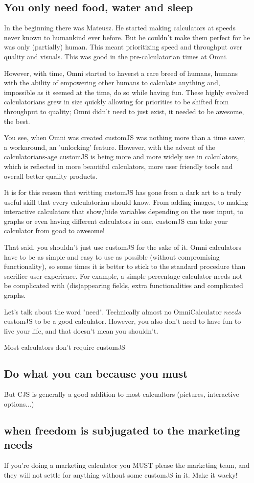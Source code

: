 \subsection{You only need food, water and sleep}
\label{sub:need}
In the beginning there was Mateusz. He started making calculators at speeds never known to humankind ever before. But he couldn't make them perfect for he was only (partially) human. This meant prioritizing speed and throughput over quality and visuals. This was good in the pre-calculatorian times at Omni.

However, with time, Omni started to haverst a rare breed of humans, humans with the ability of empowering other humans to calculate anything and, impossible as it seemed at the time, do so while having fun. These highly evolved calculatorians grew in size quickly allowing for priorities to be shifted from throughput to quality; Omni didn't need to just exist, it needed to be awesome, the best.

You see, when Omni was created customJS was nothing more than a time saver, a workaround, an 'unlocking' feature. However, with the advent of the calculatorians-age customJS is being more and more widely use in calculators, which is reflected in more beautiful calculators, more user friendly tools and overall better quality products. 

It is for this reason that writting customJS has gone from a dark art to a truly useful skill that every calculatorian should know. From adding images, to making interactive calculators that show/hide variables depending on the user input, to graphs or even having different calculators in one, customJS can take your calculator from good to awesome!

That said, you shouldn't just use customJS for the sake of it. Omni calculators have to be as simple and easy to use as possible (without compromising functionality), so some times it is better to stick to the standard procedure than sacrifice user experience. For example, a simple percentage calculator needs not be complicated with (dis)appearing fields, extra functionalities and complicated graphs.

Let's talk about the word "need". Technically almost no OmniCalculator $needs$ customJS to be a good calculator. However, you also don't need to have fun to live your life, and that doesn't mean you shouldn't. 


Most calculators don't require customJS

\subsection{Do what you can because you must}
\label{sub:whenToCJS}
But CJS is generally a good addition to most calcualtors (pictures, interactive options...)

\subsection{when freedom is subjugated to the marketing needs}
\label{sub:marketing}
If you're doing a marketing calculator you MUST please the marketing team, and they will not settle for anything without some customJS in it. Make it wacky!



    
